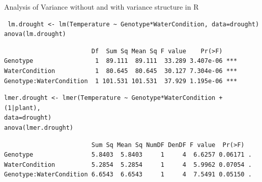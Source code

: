 \documentclass{beamer}
\makeatletter
\newenvironment{kframe}{%
 \def\at@end@of@kframe{}%
 \ifinner\ifhmode%
  \def\at@end@of@kframe{\end{minipage}}%
  \begin{minipage}{\columnwidth}%
 \fi\fi%
 \def\FrameCommand##1{\hskip\@totalleftmargin \hskip-\fboxsep
 \colorbox{shadecolor}{##1}\hskip-\fboxsep
     \hskip-\linewidth \hskip-\@totalleftmargin \hskip\columnwidth}%
 \MakeFramed {\advance\hsize-\width
   \@totalleftmargin\z@ \linewidth\hsize
   \@setminipage}}%
 {\par\unskip\endMakeFramed%
 \at@end@of@kframe}
\newenvironment{knitrout}{}{} %
\makeatother
\begin{document}
\begin{frame}[fragile]{Analysis of Variance without and with variance structure in R}
 
 \pause 
  \begin{knitrout}
 \footnotesize
{}\color{fgcolor}\begin{kframe}
\begin{verbatim}
 lm.drought <- lm(Temperature ~ Genotype*WaterCondition, data=drought)
anova(lm.drought)

\end{verbatim}
\end{kframe}
\end{knitrout}
\pause
  \begin{knitrout}
 \footnotesize
{}\color{fgcolor}\begin{kframe}
\begin{verbatim}
                        Df  Sum Sq Mean Sq F value    Pr(>F)    
Genotype                 1  89.111  89.111  33.289 3.407e-06 ***
WaterCondition           1  80.645  80.645  30.127 7.304e-06 ***
Genotype:WaterCondition  1 101.531 101.531  37.929 1.195e-06 ***
\end{verbatim}
\end{kframe}
\end{knitrout}

\pause
 \begin{knitrout}
 \footnotesize
{}\color{fgcolor}\begin{kframe}
\begin{verbatim}
lmer.drought <- lmer(Temperature ~ Genotype*WaterCondition + (1|plant),
data=drought)
anova(lmer.drought)
\end{verbatim}
\end{kframe}
\end{knitrout}

  \begin{knitrout}
 \footnotesize
{}\color{fgcolor}\begin{kframe}
\begin{verbatim}
                        Sum Sq Mean Sq NumDF DenDF F value  Pr(>F)  
Genotype                5.8403  5.8403     1     4  6.6257 0.06171 .
WaterCondition          5.2854  5.2854     1     4  5.9962 0.07054 .
Genotype:WaterCondition 6.6543  6.6543     1     4  7.5491 0.05150 .
\end{verbatim}
\end{kframe}
\end{knitrout}
 
\end{frame}
\end{document}
